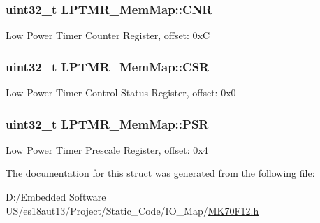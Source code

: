 \subsubsection[{C\+N\+R}]{\setlength{\rightskip}{0pt plus 5cm}uint32\+\_\+t L\+P\+T\+M\+R\+\_\+\+Mem\+Map\+::\+C\+N\+R}\label{struct_l_p_t_m_r___mem_map_adda036ea26ea5cc89d7957779c5680f0}
Low Power Timer Counter Register, offset\+: 0x\+C \hypertarget{struct_l_p_t_m_r___mem_map_a4dcb593756f09d67e3d064d95e3f2d68}{}
\subsubsection[{C\+S\+R}]{\setlength{\rightskip}{0pt plus 5cm}uint32\+\_\+t L\+P\+T\+M\+R\+\_\+\+Mem\+Map\+::\+C\+S\+R}\label{struct_l_p_t_m_r___mem_map_a4dcb593756f09d67e3d064d95e3f2d68}
Low Power Timer Control Status Register, offset\+: 0x0 \hypertarget{struct_l_p_t_m_r___mem_map_a05f0c5c90722e5a1757c262c818d2462}{}
\subsubsection[{P\+S\+R}]{\setlength{\rightskip}{0pt plus 5cm}uint32\+\_\+t L\+P\+T\+M\+R\+\_\+\+Mem\+Map\+::\+P\+S\+R}\label{struct_l_p_t_m_r___mem_map_a05f0c5c90722e5a1757c262c818d2462}
Low Power Timer Prescale Register, offset\+: 0x4 

The documentation for this struct was generated from the following file\+:\begin{DoxyCompactItemize}
\item 
D\+:/\+Embedded Software U\+S/es18aut13/\+Project/\+Static\+\_\+\+Code/\+I\+O\+\_\+\+Map/\hyperlink{_m_k70_f12_8h}{M\+K70\+F12.\+h}\end{DoxyCompactItemize}
